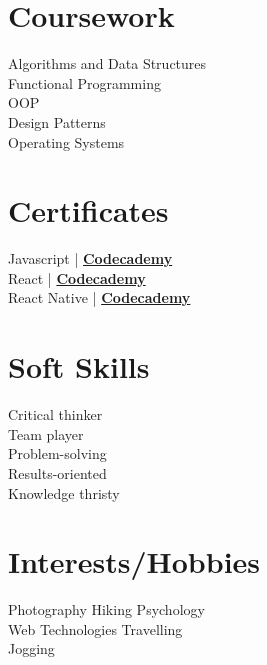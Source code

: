 \documentclass[letterpaper]{algo-resume}
\begin{document}
\begin{minipage}[t]{0.33\textwidth}
\sectionspace 


\section{Coursework}

Algorithms and Data Structures \\
Functional Programming \\
OOP \\
Design Patterns \\
Operating Systems \\

\sectionspace 

\section{Certificates}

Javascript | \href{https://www.codecademy.com/profiles/algo101/certificates/705dcb15de0da4dd9d9fc4f3274b430e}{\bf Codecademy} \\
React | \href{https://www.codecademy.com/profiles/algo101/certificates/af00e5032d0a68cc84879983f5d8333b}{\bf Codecademy} \\
React Native | \href{https://www.codecademy.com/profiles/algo101/certificates/458aef4eef5f5130685423fc15e6493d}{\bf Codecademy}

\sectionspace


\section{Soft Skills}
Critical thinker \\
Team player \\
Problem-solving \\
Results-oriented \\
Knowledge thristy


\sectionspace 


\section{Interests/Hobbies}

Photography \textbullet{} Hiking \textbullet{} Psychology \\ 
Web Technologies \textbullet{} Travelling   \\
Jogging


\end{minipage} 
\end{document}
